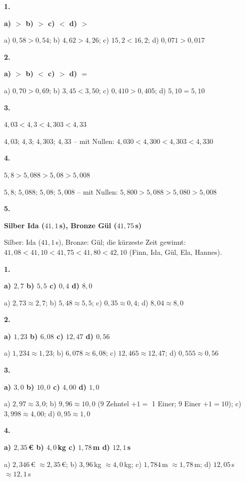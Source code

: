 \documentclass[11pt]{article}
\newcommand{\lsg}[3]{\par\noindent\begin{minipage}[t]{9mm}\textbf{#1}\end{minipage}%
  \begin{minipage}[t]{52mm}\raggedright\bfseries\boldmath #2\end{minipage}\hspace{3mm}%
  \begin{minipage}[t]{\dimexpr\linewidth-64mm\relax}\raggedright\small #3\end{minipage}\par\vspace{4pt}}
\begin{document}
\par\smallskip
{}\par
\par\Needspace{25mm}\vspace{6pt}\noindent\colorbox{black!12}{}\hspace{2mm}{\bfseries Vergleichen und ordnen}\par\vspace{4pt}
\lsg{1.}{a) $>$ \quad b) $>$ \quad c) $<$ \quad d) $>$}{a) $0{,}58 > 0{,}54$; b) $4{,}62 > 4{,}26$; c) $15{,}2 < 16{,}2$; d) $0{,}071 > 0{,}017$}
\lsg{2.}{a) $>$ \quad b) $<$ \quad c) $>$ \quad d) $=$}{a) $0{,}70 > 0{,}69$; b) $3{,}45 < 3{,}50$; c) $0{,}410 > 0{,}405$; d) $5{,}10 = 5{,}10$}
\lsg{3.}{$4{,}03 < 4{,}3 < 4{,}303 < 4{,}33$}{$4{,}03$; $4{,}3$; $4{,}303$; $4{,}33$ – mit Nullen: $4{,}030 < 4{,}300 < 4{,}303 < 4{,}330$}
\lsg{4.}{$5{,}8 > 5{,}088 > 5{,}08 > 5{,}008$}{$5{,}8$; $5{,}088$; $5{,}08$; $5{,}008$ – mit Nullen: $5{,}800 > 5{,}088 > 5{,}080 > 5{,}008$}
\lsg{5.}{Silber Ida ($41{,}1$\,s), Bronze Gül ($41{,}75$\,s)}{Silber: Ida ($41{,}1$\,s), Bronze: Gül; die kürzeste Zeit gewinnt: $41{,}08 < 41{,}10 < 41{,}75 < 41{,}80 < 42{,}10$ (Finn, Ida, Gül, Ela, Hannes).}
\par\Needspace{25mm}\vspace{6pt}\noindent\colorbox{black!12}{}\hspace{2mm}{\bfseries Runden}\par\vspace{4pt}
\lsg{1.}{a) $2{,}7$ \quad b) $5{,}5$ \quad c) $0{,}4$ \quad d) $8{,}0$}{a) $2{,}73 \approx 2{,}7$; b) $5{,}48 \approx 5{,}5$; c) $0{,}35 \approx 0{,}4$; d) $8{,}04 \approx 8{,}0$}
\lsg{2.}{a) $1{,}23$ \quad b) $6{,}08$ \quad c) $12{,}47$ \quad d) $0{,}56$}{a) $1{,}234 \approx 1{,}23$; b) $6{,}078 \approx 6{,}08$; c) $12{,}465 \approx 12{,}47$; d) $0{,}555 \approx 0{,}56$}
\lsg{3.}{a) $3{,}0$ \quad b) $10{,}0$ \quad c) $4{,}00$ \quad d) $1{,}0$}{a) $2{,}97 \approx 3{,}0$; b) $9{,}96 \approx 10{,}0$ (9 Zehntel $+ 1 =$ 1 Einer; 9 Einer $+ 1 = 10$); c) $3{,}998 \approx 4{,}00$; d) $0{,}95 \approx 1{,}0$}
\lsg{4.}{a) $2{,}35$\,€ \quad b) $4{,}0$\,kg \quad c) $1{,}78$\,m \quad d) $12{,}1$\,s}{a) $2{,}346$\,€ $\approx 2{,}35$\,€; b) $3{,}96$\,kg $\approx 4{,}0$\,kg; c) $1{,}784$\,m $\approx 1{,}78$\,m; d) $12{,}05$\,s $\approx 12{,}1$\,s}
\end{document}
